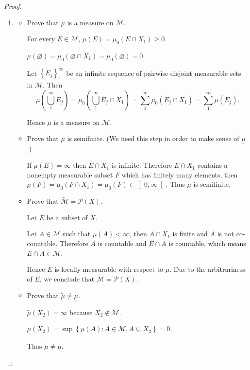 \begin{proof}
\begin{enumerate}[itemsep=0pt,label=\textbf{\alph*.}]
              \bigskip

              Thus \( \underline{\mu} \) is a saturated measure on \( (X, \widetilde{\mathcal{M}}) \) and \( \underline{\mu} \) extends \( \mu \).
        \item \begin{itemize}
                  \item Prove that \( \mu \) is a measure on \( \mathcal{M} \).

                        For every \( E \in \mathcal{M} \), \( \mu(E) = \mu_{0}(E \cap X_{1}) \ge 0 \).

                        \( \mu(\varnothing) = \mu_{0}(\varnothing \cap X_{1}) = \mu_{0}(\varnothing) = 0 \).

                        Let \( {\left\{ E_{j} \right\}}_{1}^{\infty} \) be an infinite sequence of pairwise disjoint measurable sets in \( \mathcal{M} \). Then
                        \[
                            \mu\left(\bigcup_{1}^{\infty} E_{j}\right) = \mu_{0}\left( \bigcup_{1}^{\infty} E_{j} \cap X_{1} \right) = \sum_{1}^{\infty} \mu_{0}(E_{j} \cap X_{1}) = \sum_{1}^{\infty} \mu(E_{j}).
                        \]

                        Hence \( \mu \) is a measure on \( \mathcal{M} \).
                  \item Prove that \( \mu \) is semifinite. (We need this step in order to make sense of \( \underline{\mu} \).)

                        If \( \mu(E) = \infty \) then \( E \cap X_{1} \) is infinite. Therefore \( E \cap X_{1} \) contains a nonempty measurable subset \( F \) which has finitely many elements, then \( \mu(F) = \mu_{0}(F \cap X_{1}) = \mu_{0}(F) \in \left\rbrack 0, \infty \right\lbrack \). Thus \( \mu \) is semifinite.
                  \item Prove that \( \widetilde{\mathcal{M}} = \mathcal{P}(X) \).

                        Let \( E \) be a subset of \( X \).

                        Let \( A \in \mathcal{M} \) such that \( \mu(A) < \infty \), then \( A \cap X_{1} \) is finite and \( A \) is not co-countable. Therefore \( A \) is countable and \( E \cap A \) is countable, which means \( E \cap A \in \mathcal{M} \).

                        Hence \( E \) is locally measurable with respect to \( \mu \). Due to the arbitrariness of \( E \), we conclude that \( \widetilde{\mathcal{M}} = \mathcal{P}(X) \).
                  \item Prove that \( \widetilde{\mu} \ne \underline{\mu} \).

                        \( \widetilde{\mu}(X_{2}) = \infty \) because \( X_{2} \notin \mathcal{M} \).

                        \( \underline{\mu}(X_{2}) = \sup\left\{ \mu(A) : A \in \mathcal{M}, A \subseteq X_{2} \right\} = 0 \).

                        Thus \( \widetilde{\mu} \ne \underline{\mu} \).
              \end{itemize}
    \end{enumerate}
\end{proof}
